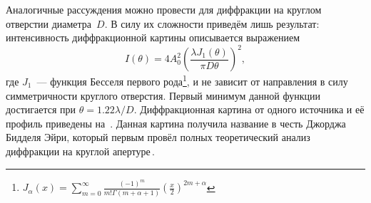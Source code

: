 Аналогичные рассуждения можно провести для диффракции на круглом отверстии диаметра~$D$. В силу их сложности приведём лишь результат: интенсивность диффракционной картины описывается выражением 
\begin{equation*}
    I(\theta) = 4 A_0^2 \left( \frac{\lambda J_1 (\theta)}{\pi D \theta} \right)^2,
\end{equation*}
где $J_1$~--- функция Бесселя первого рода\footnote{$J_\alpha(x) = \sum\limits_{m=0}^\infty \frac{(-1)^m}{m! \Gamma(m + \alpha + 1)} \left( \frac{x}{2} \right)^{2m + \alpha}$}, и не зависит от направления в силу симметричности круглого отверстия. Первый минимум данной функции достигается при $\theta = 1.22\lambda / D$. Диффракционная картина от одного источника и её профиль приведены на~. Данная картина получила название  в честь Джорджа Бидделя Эйри, который первым провёл полных теоретический анализ диффракции на круглой апертуре\,\cite{eiry_circle}.

